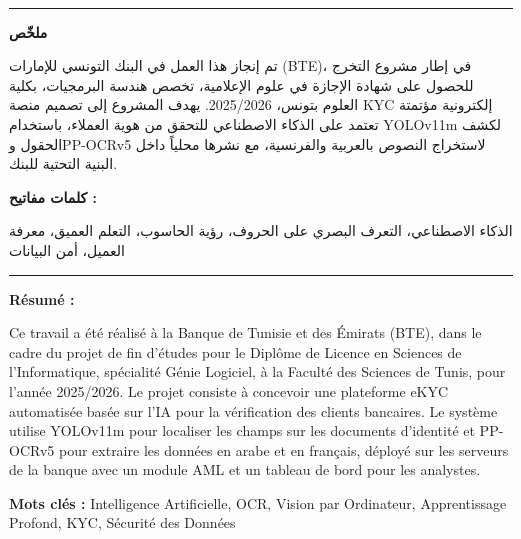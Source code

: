 \documentclass[12pt,a4paper]{report}
\newcommand{\titrespecial}[1]{%
  \noindent{\normalfont\LARGE\bfseries\color{bleu_principal} #1}\\[-0.3em]%
  \noindent\textcolor{bleu_principal}{\rule{\textwidth}{0.8pt}}%
  \vspace{1em}%
}
\begin{document}
\clearpage
\thispagestyle{fancy}
{

\titrespecial{Résumé}

\begin{flushright}
\begin{minipage}{0.95\textwidth}
  \raggedleft
  {\normalsize\bfseries\color{bleu_principal} ملخّص}\\[0.3em]
  \begin{Arabic}
  {\small
  تم إنجاز هذا العمل في البنك التونسي للإمارات (BTE)، في إطار مشروع التخرج للحصول على شهادة الإجازة في علوم الإعلامية، تخصص هندسة البرمجيات، بكلية العلوم بتونس، 2025/2026.
  يهدف المشروع إلى تصميم منصة KYC إلكترونية مؤتمتة تعتمد على الذكاء الاصطناعي للتحقق من هوية العملاء، باستخدام YOLOv11m لكشف الحقول وPP-OCRv5 لاستخراج النصوص بالعربية والفرنسية، مع نشرها محلياً داخل البنية التحتية للبنك.
  }
  \end{Arabic}
  {\small\bfseries\color{bleu_principal} كلمات مفاتيح :}
  \begin{Arabic}
  {\small الذكاء الاصطناعي، التعرف البصري على الحروف، رؤية الحاسوب، التعلم العميق، معرفة العميل، أمن البيانات}
  \end{Arabic}
\end{minipage}
\end{flushright}

\vspace{0.6em}
\noindent\textcolor{bleu_principal}{\rule{\textwidth}{0.4pt}}
\vspace{0.5em}

{\normalsize\bfseries\color{bleu_principal} Résumé :}

\vspace{0.3em}
{\small
Ce travail a été réalisé à la Banque de Tunisie et des Émirats (BTE), dans le cadre du projet de fin d'études pour le Diplôme de Licence en Sciences de l'Informatique, spécialité Génie Logiciel, à la Faculté des Sciences de Tunis, pour l'année 2025/2026. Le projet consiste à concevoir une plateforme eKYC automatisée basée sur l'IA pour la vérification des clients bancaires. Le système utilise YOLOv11m pour localiser les champs sur les documents d'identité et PP-OCRv5 pour extraire les données en arabe et en français, déployé sur les serveurs de la banque avec un module AML et un tableau de bord pour les analystes.
}

\vspace{0.2em}
{\small\textbf{Mots clés :} Intelligence Artificielle, OCR, Vision par Ordinateur, Apprentissage Profond, KYC, Sécurité des Données}

}
\end{document}
